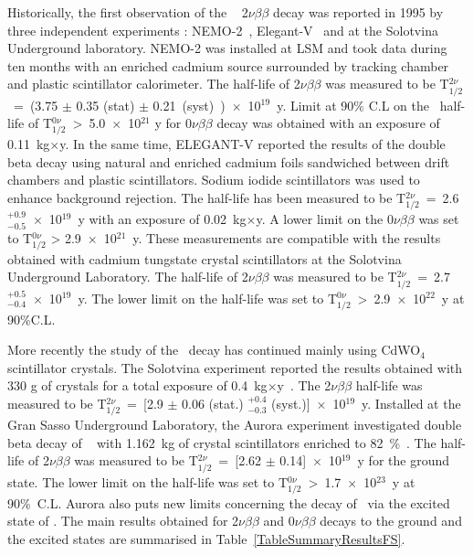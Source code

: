 \documentclass[main.tex]{subfiles}
\begin{document}
\bigskip


\NI Historically, the first observation of the \Cd~ 2$\nu\beta\beta$ decay was reported in 1995 by three independent experiments : NEMO-2~\cite{Barabash2010ie}, Elegant-V~\cite{ElegantV-1} and at the Solotvina Underground laboratory\cite{Aurora}. NEMO-2 was installed at LSM and took data during ten months with an enriched cadmium source surrounded by tracking chamber and plastic scintillator calorimeter. The half-life of 2$\nu\beta\beta$ was measured to be T$_{\text{1}/\text{2}}^{\text{2}\nu}$~=~(3.75 $\pm$ 0.35 (stat) $\pm$ 0.21~(syst)~)~$\times$~10$^{\text{19}}$~y. Limit at 90\% C.L on the \Cd~half-life of T$_{\text{1}/\text{2}}^{\text{0}\nu}$~>~5.0~$\times$~10$^{\text{21}}$ y for 0$\nu\beta\beta$ decay was obtained with an exposure of 0.11~kg$\times$y. In the same time, ELEGANT-V reported the results of the double beta decay using natural and enriched cadmium foils sandwiched between drift chambers and plastic scintillators. Sodium iodide scintillators was used to enhance background rejection. The half-life has been measured to be T$_{\text{1}/\text{2}}^{\text{2}\nu}$~=~2.6 $^{+\text{0.9}}_{-\text{0.5}}$~$\times$~10$^{\text{19}}$~y with an exposure of 0.02~kg$\times$y. A lower limit on the 0$\nu\beta\beta$ was set to T$_{\text{1}/\text{2}}^{\text{0}\nu}$ > 2.9~$\times$~10$^{\text{21}}$~y. These measurements are compatible with the results obtained with cadmium tungstate crystal scintillators at the Solotvina Underground Laboratory.  The half-life of 2$\nu\beta\beta$ was measured to be T$_{\text{1}/\text{2}}^{\text{2}\nu}$~=~2.7$^{+\text{0.5}}_{-\text{0.4}}$~$\times$~10$^{\text{19}}$~y. The lower limit on the half-life was set to T$_{\text{1}/\text{2}}^{\text{0}\nu}$~>~2.9~$\times$~10$^{\text{22}}$~y at 90\%C.L. 


\bigskip


\NI More recently the study of the \Cd~decay has continued mainly using CdWO$_{\text{4}}$ scintillator crystals. The Solotvina experiment reported the results obtained with 330 g of crystals for a total exposure  of 0.4~kg$\times$y~\cite{Solotvina}. The 2$\nu\beta\beta$ half-life was measured to be T$_{\text{1}/\text{2}}^{\text{2}\nu}$~=~[2.9 $\pm$ 0.06 (stat.) $^{+\text{0.4}}_{-\text{0.3}}$ (syst.)]~$\times$~10$^{\text{19}}$~y. Installed at the Gran Sasso Underground Laboratory, the Aurora experiment investigated double beta decay of \Cd~ with 1.162~kg of crystal scintillators enriched to 82~\%~\cite{Aurora}. The half-life of 2$\nu\beta\beta$ was measured to be T$_{\text{1}/\text{2}}^{\text{2}\nu}$~=~[2.62 $\pm$ 0.14]~$\times$~10$^{\text{19}}$~y for the ground state. The lower limit on the half-life was set to T$_{\text{1}/\text{2}}^{\text{0}\nu}$~>~1.7~$\times$~10$^{\text{23}}$~y at 90\%~C.L. Aurora also puts new limits concerning the decay of \Cd~via the excited state of \Sn. The main results obtained for 2$\nu\beta\beta$ and 0$\nu\beta\beta$ decays to the ground and the excited states are summarised in Table~\ref{TableSummaryResultsFS}.
\end{document}
